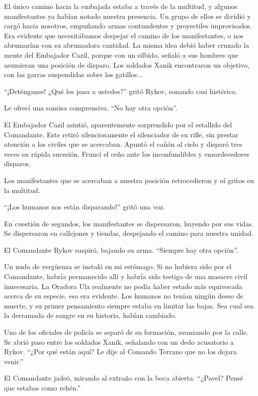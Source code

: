\documentclass[spanish,12pt,a4paper,oneside,titlepage]{book}
\begin{document}
    El único camino hacia la embajada estaba a través de la multitud, y algunos manifestantes ya habían notado nuestra presencia. Un grupo de ellos se dividió y cargó hacia nosotros, empuñando armas contundentes y proyectiles improvisados. Era evidente que necesitábamos despejar el camino de los manifestantes, o nos abrumarían con su abrumadora cantidad. La misma idea debió haber cruzado la mente del Embajador Cazil, porque con un silbido, señaló a sus hombres que asumieran una posición de disparo. Los soldados Xanik encontraron un objetivo, con las garras suspendidas sobre los gatillos...

    ``¡Deténganse! ¿Qué les pasa a ustedes?'' gritó Rykov, sonando casi histérico.

    Le ofrecí una sonrisa comprensiva. ``No hay otra opción''.

    El Embajador Cazil asintió, aparentemente sorprendido por el estallido del Comandante. Este retiró silenciosamente el silenciador de su rifle, sin prestar atención a los civiles que se acercaban. Apuntó el cañón al cielo y disparó tres veces en rápida sucesión. Fruncí el ceño ante los inconfundibles y ensordecedores disparos.

    Los manifestantes que se acercaban a nuestra posición retrocedieron y oí gritos en la multitud.

    ``¡Los humanos nos están disparando!'' gritó una voz.

    En cuestión de segundos, los manifestantes se dispersaron, huyendo por sus vidas. Se dispersaron en callejones y tiendas, despejando el camino para nuestra unidad.

    El Comandante Rykov suspiró, bajando su arma. ``Siempre hay otra opción''.

    Un nudo de vergüenza se instaló en mi estómago. Si no hubiera sido por el Comandante, habría permanecido allí y habría sido testigo de una masacre civil innecesaria. La Oradora Ula realmente no podía haber estado más equivocada acerca de su especie, eso era evidente. Los humanos no tenían ningún deseo de muerte, y su primer pensamiento siempre estaba en limitar las bajas. Sea cual sea la derramada de sangre en su historia, habían cambiado.

    Uno de los oficiales de policía se separó de su formación, avanzando por la calle. Se abrió paso entre los soldados Xanik, señalando con un dedo acusatorio a Rykov. ``¿Por qué están aquí? Le dije al Comando Terrano que no los dejara venir.''

    El Comandante jadeó, mirando al extraño con la boca abierta. ``¿Pavel? Pensé que estabas como rehén.''
\end{document}
